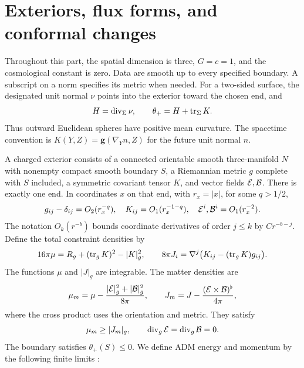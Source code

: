 \section{Exteriors, flux forms, and conformal changes}
\label{ch:pre:section}

Throughout this part, the spatial dimension is three, $G=c=1$, and the cosmological constant is zero. Data are smooth up to every specified boundary. A subscript on a norm specifies its metric when needed. For a two-sided surface, the designated unit normal $\nu$ points into the exterior toward the chosen end, and
\[
 H=\operatorname{div}_\Sigma\nu,\qquad \theta_+=H+\operatorname{tr}_\Sigma K.
\]
Thus outward Euclidean spheres have positive mean curvature. The spacetime convention is $K(Y,Z)=\mathbf g(\nabla_Y n,Z)$ for the future unit normal $n$.

\begin{definition}\label{ch:pre:charged-exterior}
A charged exterior consists of a connected orientable smooth three-manifold $N$ with nonempty compact smooth boundary $S$, a Riemannian metric $g$ complete with $S$ included, a symmetric covariant tensor $K$, and vector fields $\mathcal E,\mathcal B$. There is exactly one end. In coordinates $x$ on that end, with $r_x=|x|$, for some $q>1/2$,
\begin{equation}\label{ch:pre:falloff}
 g_{ij}-\delta_{ij}=O_2(r_x^{-q}),\quad
 K_{ij}=O_1(r_x^{-1-q}),\quad
 \mathcal E^i,\mathcal B^i=O_1(r_x^{-2}).
\end{equation}
The notation $O_k(r^{-b})$ bounds coordinate derivatives of order $j\le k$ by $Cr^{-b-j}$. Define the total constraint densities by
\begin{equation}\label{ch:pre:constraints}
 16\pi\mu=R_g+(\operatorname{tr}_gK)^2-|K|_g^2,
 \qquad
 8\pi J_i=\nabla^j\bigl(K_{ij}-(\operatorname{tr}_gK)g_{ij}\bigr).
\end{equation}
The functions $\mu$ and $|J|_g$ are integrable. The matter densities are
\begin{equation}\label{ch:pre:matter}
 \mu_m=\mu-\frac{|\mathcal E|_g^2+|\mathcal B|_g^2}{8\pi},
 \qquad
 J_m=J-\frac{(\mathcal E\times\mathcal B)^\flat}{4\pi},
\end{equation}
where the cross product uses the orientation and metric. They satisfy
\begin{equation}\label{ch:pre:charged-dec}
 \mu_m\ge |J_m|_g,\qquad
 \operatorname{div}_g\mathcal E=\operatorname{div}_g\mathcal B=0.
\end{equation}
The boundary satisfies $\theta_+(S)\le0$. We define ADM energy and momentum
by the following finite limits \cite{ArnowittDeserMisner1962}:
\begin{align}

\end{align}
\end{definition}

